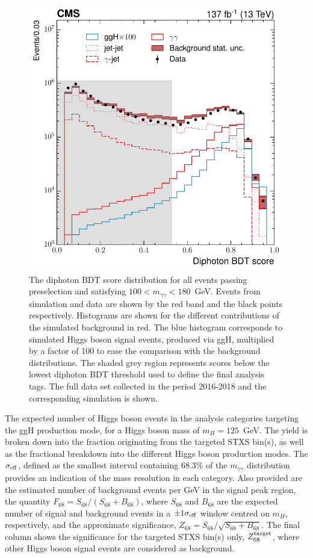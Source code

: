 \begin{figure}[htb!]
  \centering
  \includegraphics[width=.5\textwidth]{Figures/hgg_overview/DiphoBDT_dipho_mva_logPlot_noStack.pdf}
  \caption[Diphoton BDT output distribution]
  {
    The diphoton BDT score distribution for all events passing preselection and satisfying $100<m_{\gamma\gamma}<180$~GeV. Events from simulation and data are shown by the red band and the black points respectively. Histograms are shown for the different contributions of the simulated background in red. The blue histogram corresponds to simulated Higgs boson signal events, produced via ggH, multiplied by a factor of 100 to ease the comparison with the background distributions. The shaded grey region represents scores below the lowest diphoton BDT threshold used to define the final analysis tags. The full data set collected in the period 2016-2018 and the corresponding simulation is shown.
  }
  \label{fig:diphoton_score}
\end{figure}

\begin{table}[htb!]
    \caption[Expected yields for the ggH production mode categories]{The expected number of Higgs boson events in the analysis categories targeting the ggH production mode, for a Higgs boson mass of $m_H=125$~GeV. The yield is broken down into the fraction originating from the targeted STXS bin(s), as well as the fractional breakdown into the different Higgs boson production modes. The $\sigma_{\rm{eff}}$, defined as the smallest interval containing 68.3\% of the $m_{\gamma\gamma}$ distribution provides an indication of the mass resolution in each category. Also provided are the estimated number of background events per GeV in the signal peak region, the quantity $F_{68}=S_{68}/(S_{68}+B_{68})$, where $S_{68}$ and $B_{68}$ are the expected number of signal and background events in a $\pm1\sigma_{\rm{eff}}$ window centred on $m_H$, respectively, and the approximate significance, $Z_{68}=S_{68}/\sqrt{S_{68}+B_{68}}$. The final column shows the significance for the targeted STXS bin(s) only, $Z^{\rm{target}}_{68}$,  where other Higgs boson signal events are considered as background.}
    \label{tab:ggH_category_yields}
    \centering
    \scriptsize
    \renewcommand{\arraystretch}{1.3}
    \setlength{\tabcolsep}{3pt}
    \hspace*{-5cm}
    
    \hspace*{-5cm}
\end{table}

